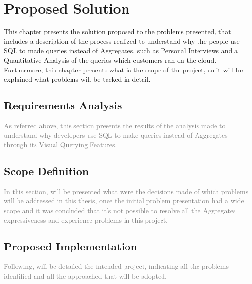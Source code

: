\chapter{Proposed Solution}
\label{cha:proposed_solution}
This chapter presents the solution proposed to the problems presented, that includes a description of the process realized to understand why the people use SQL to made queries instead of Aggregates, such as Personal Interviews and a Quantitative Analysis of the queries which customers ran on the cloud. Furthermore, this chapter presents what is the scope of the project, so it will be explained what problems will be tacked in detail.

\section{Requirements Analysis}
\label{sec:requirements_analysis}
\textcolor{gray}{As referred above, this section presents the results of the analysis made to understand why developers use SQL to make queries instead of Aggregates through its Visual Querying Features.}

\section{Scope Definition}
\label{sec:scope_definition}
\textcolor{gray}{In this section, will be presented what were the decisions made of which problems will be addressed in this thesis, once the initial problem presentation had a wide scope and it was concluded that it's not possible to resolve all the Aggregates expressiveness and experience problems in this project.}

\section{Proposed Implementation}
\label{sec:proposed_implementation}
\textcolor{gray}{Following, will be detailed the intended project, indicating all the problems identified and all the approached that will be adopted.}